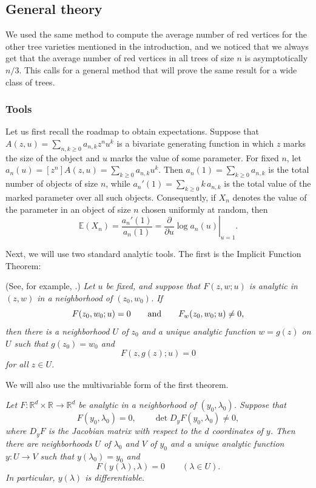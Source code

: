 \documentclass[10pt,a4paper]{amsart}
\theoremstyle{remark}
\begin{document}
\subsection{General theory}
\label{sec:general}

We used the same method to compute the average number of red vertices for the other tree varieties mentioned in the introduction, and we noticed that we always get that the average number of red vertices in all trees of size $n$ is asymptotically $n/3$. This calls for a general method that will prove the same result for a wide class of trees.

\subsubsection{Tools}\label{subsubsec:tools}

Let us first recall the roadmap to obtain expectations.
Suppose that
$
A(z,u)=\sum_{n,k\geq 0} a_{n,k}z^n u^k
$
is a bivariate generating function in which \(z\) marks the size of the object and \(u\) marks the value of some parameter. For fixed \(n\), let
$
a_n(u)=[z^n]A(z,u)=\sum_{k\geq 0} a_{n,k}u^k.
$
Then
$
a_n(1)=\sum_{k\geq 0}a_{n,k}
$
is the total number of objects of size \(n\), while
$
a_n'(1)=\sum_{k\geq 0}k\,a_{n,k}
$
is the total value of the marked parameter over all such objects. Consequently, if \(X_n\) denotes the value of the parameter in an object of size \(n\) chosen uniformly at random, then
\begin{equation}
\label{eq:expectations}
\mathbb E(X_n)
=
\frac{a_n'(1)}{a_n(1)}
=
\left.
\frac{\partial}{\partial u}
\log a_n(u)
\right|_{u=1}.
\end{equation}


Next, we will use two standard analytic tools. The first is the Implicit Function Theorem:

\medskip
{}
(See, for example, \cite[Appendix B.5]{FlajoletSedgewick}.)
\emph{
Let $u$ be fixed, and suppose that $F(z,w;u)$ is analytic in $(z,w)$ in a neighborhood of $(z_0,w_0)$. If
\[
F(z_0,w_0;u)=0
\qquad\hbox{and}\qquad
F_w(z_0,w_0;u)\neq 0,
\]
then there is a neighborhood $U$ of $z_0$ and a unique analytic function $w=g(z)$ on $U$ such that $g(z_0)=w_0$ and
\[
F(z,g(z);u)=0
\]
for all $z\in U$.
}
\medskip

We will also use the multivariable form of the first theorem.

\medskip
{}
\emph{
Let $F\colon \mathbb R^d\times\mathbb R\to\mathbb R^d$ be analytic in a
neighborhood of $(y_0,\lambda_0)$. Suppose that
\[
F(y_0,\lambda_0)=0,
\qquad
\det D_yF(y_0,\lambda_0)\neq0,
\]
where $D_yF$ is the Jacobian matrix with respect to the $d$ coordinates
of $y$. Then there are neighborhoods $U$ of $\lambda_0$ and $V$ of
$y_0$ and a unique analytic function $y\colon U\to V$ such that
$y(\lambda_0)=y_0$ and
\[
F(y(\lambda),\lambda)=0\qquad(\lambda\in U).
\]
In particular, $y(\lambda)$ is differentiable.
}
\medskip
\end{document}
